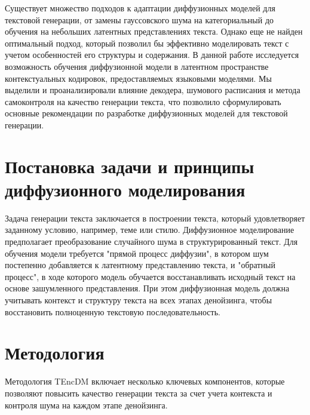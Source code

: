 \documentclass[a4paper, 12pt]{article}
\begin{document}
Существует множество подходов к адаптации диффузионных моделей для текстовой генерации, от замены гауссовского шума на категориальный до обучения на небольших латентных представлениях текста. Однако еще не найден оптимальный подход, который позволил бы эффективно моделировать текст с учетом особенностей его структуры и содержания. В данной работе исследуется возможность обучения диффузионной модели в латентном пространстве контекстуальных кодировок, предоставляемых языковыми моделями. Мы выделили и проанализировали влияние декодера, шумового расписания и метода самоконтроля на качество генерации текста, что позволило сформулировать основные рекомендации по разработке диффузионных моделей для текстовой генерации.

\section{Постановка задачи и принципы диффузионного моделирования}
Задача генерации текста заключается в построении текста, который удовлетворяет заданному условию, например, теме или стилю. Диффузионное моделирование предполагает преобразование случайного шума в структурированный текст. Для обучения модели требуется "прямой процесс диффузии", в котором шум постепенно добавляется к латентному представлению текста, и "обратный процесс", в ходе которого модель обучается восстанавливать исходный текст на основе зашумленного представления. При этом диффузионная модель должна учитывать контекст и структуру текста на всех этапах денойзинга, чтобы восстановить полноценную текстовую последовательность.

\section{Методология}
Методология TEncDM включает несколько ключевых компонентов, которые позволяют повысить качество генерации текста за счет учета контекста и контроля шума на каждом этапе денойзинга.
\end{document}
